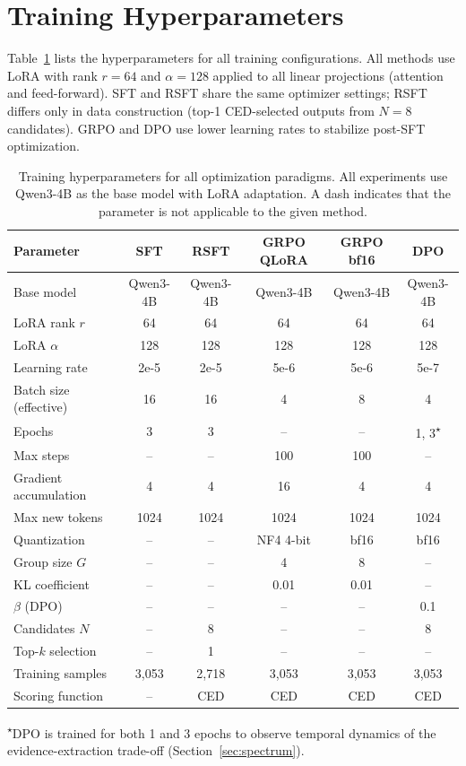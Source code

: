\section{Training Hyperparameters}
\label{sec:hyperparams}

Table~\ref{tab:hyperparams} lists the hyperparameters for all training configurations. All methods use LoRA with rank $r{=}64$ and $\alpha{=}128$ applied to all linear projections (attention and feed-forward). SFT and RSFT share the same optimizer settings; RSFT differs only in data construction (top-1 CED-selected outputs from $N{=}8$ candidates). GRPO and DPO use lower learning rates to stabilize post-SFT optimization.

\begin{table}[t]
\centering
\caption{Training hyperparameters for all optimization paradigms. All experiments use Qwen3-4B as the base model with LoRA adaptation. A dash indicates that the parameter is not applicable to the given method.}
\label{tab:hyperparams}
\small
\begin{tabular}{lccccc}
\toprule
\textbf{Parameter} & \textbf{SFT} & \textbf{RSFT} & \textbf{GRPO QLoRA} & \textbf{GRPO bf16} & \textbf{DPO} \\
\midrule
Base model & Qwen3-4B & Qwen3-4B & Qwen3-4B & Qwen3-4B & Qwen3-4B \\
LoRA rank $r$ & 64 & 64 & 64 & 64 & 64 \\
LoRA $\alpha$ & 128 & 128 & 128 & 128 & 128 \\
Learning rate & 2e-5 & 2e-5 & 5e-6 & 5e-6 & 5e-7 \\
Batch size (effective) & 16 & 16 & 4 & 8 & 4 \\
Epochs & 3 & 3 & -- & -- & 1, 3\textsuperscript{$\star$} \\
Max steps & -- & -- & 100 & 100 & -- \\
Gradient accumulation & 4 & 4 & 16 & 4 & 4 \\
Max new tokens & 1024 & 1024 & 1024 & 1024 & 1024 \\
Quantization & -- & -- & NF4 4-bit & bf16 & bf16 \\
Group size $G$ & -- & -- & 4 & 8 & -- \\
KL coefficient & -- & -- & 0.01 & 0.01 & -- \\
$\beta$ (DPO) & -- & -- & -- & -- & 0.1 \\
Candidates $N$ & -- & 8 & -- & -- & 8 \\
Top-$k$ selection & -- & 1 & -- & -- & -- \\
Training samples & 3,053 & 2,718 & 3,053 & 3,053 & 3,053 \\
Scoring function & -- & CED & CED & CED & CED \\
\bottomrule
\end{tabular}
\vspace{1mm}
{\raggedright\footnotesize \textsuperscript{$\star$}DPO is trained for both 1 and 3 epochs to observe temporal dynamics of the evidence-extraction trade-off (Section~\ref{sec:spectrum}).\par}
\end{table}


